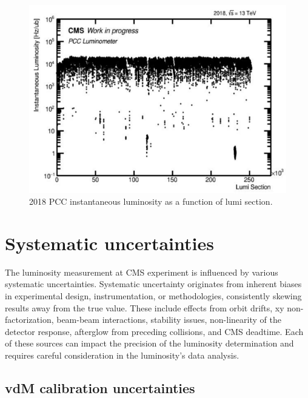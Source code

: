 \begin{figure}[!htp]
\centering
\includegraphics[width=1\textwidth]{ashish_thesis/PCClumivslumisection_2018_1.png}
\caption[2018 PCC inst. luminosity]{%
 2018 PCC instantaneous luminosity as a function of lumi section.
}
\label{fig:PCC_inst_2018}
\end{figure}

\newpage
\section{Systematic uncertainties}

The luminosity measurement at CMS experiment is influenced by various systematic uncertainties. Systematic uncertainty originates from inherent biases in experimental design, instrumentation, or methodologies, consistently skewing results away from the true value. These include effects from orbit drifts, xy non-factorization, beam-beam interactions, stability issues, non-linearity of the detector response, afterglow from preceding collisions, and CMS deadtime. Each of these sources can impact the precision of the luminosity determination and requires careful consideration in the luminosity's data analysis.

\subsection{vdM calibration uncertainties}

